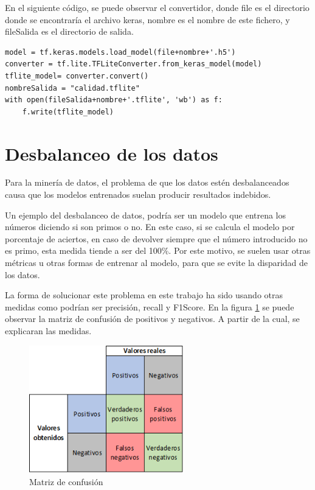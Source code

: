 En el siguiente código, se puede observar el convertidor, donde file es el directorio donde se encontraría el archivo keras, nombre es el nombre de este fichero, y fileSalida es el directorio de salida.
\begin{lstlisting}
model = tf.keras.models.load_model(file+nombre+'.h5')
converter = tf.lite.TFLiteConverter.from_keras_model(model)
tflite_model= converter.convert()
nombreSalida = "calidad.tflite"
with open(fileSalida+nombre+'.tflite', 'wb') as f:
    f.write(tflite_model)

\end{lstlisting}
\section{Desbalanceo de los datos}

Para la minería de datos, el problema de que los datos estén desbalanceados causa que los modelos entrenados suelan producir resultados indebidos.

Un ejemplo del desbalanceo de datos, podría ser un modelo que entrena los números diciendo si son primos o no. En este caso, si se calcula el modelo por porcentaje de aciertos, en caso de devolver siempre que el número introducido no es primo, esta medida tiende a ser del 100\%.
Por este motivo, se suelen usar otras métricas u otras formas de entrenar al modelo, para que se evite la disparidad de los datos.

La forma de solucionar este problema en este trabajo ha sido usando otras medidas como podrían ser precisión, recall y F1Score.
En la figura \ref{fig:matrizDeConfusion} se puede observar la matriz de confusión de positivos y negativos. A partir de la cual, se explicaran las medidas.
\begin{figure}[!ht]
         \centering
         \includegraphics[width=0.6\textwidth]{img/Matriz de confusion.png}
          \caption{Matriz de confusión}
         \label{fig:matrizDeConfusion}
\end{figure}

